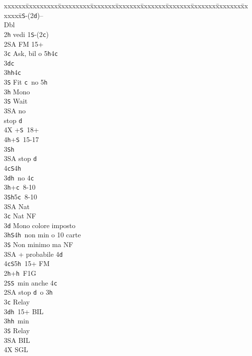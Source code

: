 \documentclass[a4paper,italian]{article}
\newcommand{\BS}{\small{\texttt{S}}}
\newcommand{\BC}{\small{\texttt{c}}}
\newcommand{\BD}{\small{\texttt{d}}}
\newcommand{\BH}{\small{\texttt{h}}}
\newenvironment{bidtable}
{\begin{tabbing}

    xxxxxx\=xxxxxxxxx\=xxxxxxxxx\=xxxxxxx\=xxxxxxx\=xxxxxxx\=xxxxxxx\=xxxxxxx\=xxxxxxx\=xxxxxxx\=\kill}
{\end{tabbing} }%
\begin{document}
\begin{multicols}{2}
    \begin{bidtable}
        1\BS-(2\BD)--\+\\
        Dbl\+\\
        2\BH \> vedi 1\BS -(2\BC )\\
        2\small{SA} \> FM 15+\+\\
        3\BC \> Ask, bil o 5\BH4\BC\+\\
        3\BD {}\BC \+\\
        3\BH {}\BH 4\BC \\
        3\BS \> Fit \BC\ no 5\BH \-\\
        3\BH \> Mono\+\\
        3\BS \> Wait\+\\
        3\small{SA}  no\+\\\-stop \BD \\
        4X +\BS\ 18+\\
        4\BH {}+\BS\ 15-17\-\-\\
        3\BS {}\BH \\
        3\small{SA}  stop \BD \\
        4\BC {}\BS 4\BH \-\\
        3\BD {}\BH\ no 4\BC \\
        3\BH {}+\BC\ 8-10\\
        3\BS {}\BH 5\BC\ 8-10\\
        3\small{SA} \> Nat\-\\
        3\BC \> Nat NF\\
        3\BD \> Mono colore imposto\\
        3\BH {}\BS 4\BH\ non min o 10 carte\\
        3\BS \> Non minimo ma NF\\
        3\small{SA} + probabile 4\BD \\
        4\BC {}\BS 5\BH\ 15+ FM\-\\
        2\BH {}+\BH\ F1G\+\\
        2\BS {}\BS\ min anche 4\BC \\
        2\small{SA}  stop \BD\ o 3\BH \+\\
        3\BC \> Relay\+\\
        3\BD {}\BH\ 15+ BIL\\
        3\BH {}\BH\ min\+\\
        3\BS \> Relay\+\\
        3\small{SA} \> BIL\\
        4X \> SGL\-\-\\

\end{bidtable}
\end{multicols}
\end{document}
